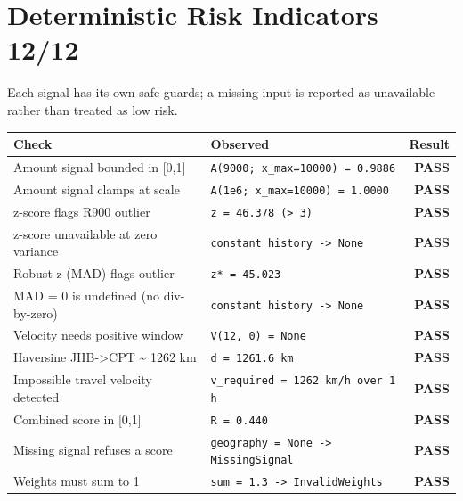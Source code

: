 \documentclass[11pt,a4paper]{article}
\newcommand{\pass}{\textcolor{PassGreen}{\textbf{PASS}}}
\begin{document}
\section*{Deterministic Risk Indicators \hfill \normalsize\textcolor{ADGBlue}{12/12}}
\noindent Each signal has its own safe guards; a missing input is reported as unavailable rather than treated as low risk.\par\vspace{0.4em}
\renewcommand{\arraystretch}{1.25}
\begin{longtable}{@{}p{}p{}r@{}}
\toprule
\textbf{Check} & \textbf{Observed} & \textbf{Result} \\
\midrule
\endhead
Amount signal bounded in [0,1] & \texttt{\small A(9000; x\_max=10000) = 0.9886} & \pass \\
Amount signal clamps at scale & \texttt{\small A(1e6; x\_max=10000) = 1.0000} & \pass \\
z-score flags R900 outlier & \texttt{\small z = 46.378 (\textgreater{} 3)} & \pass \\
z-score unavailable at zero variance & \texttt{\small constant history -\textgreater{} None} & \pass \\
Robust z (MAD) flags outlier & \texttt{\small z* = 45.023} & \pass \\
MAD = 0 is undefined (no div-by-zero) & \texttt{\small constant history -\textgreater{} None} & \pass \\
Velocity needs positive window & \texttt{\small V(12, 0) = None} & \pass \\
Haversine JHB-\textgreater{}CPT \textasciitilde{} 1262 km & \texttt{\small d = 1261.6 km} & \pass \\
Impossible travel velocity detected & \texttt{\small v\_required = 1262 km/h over 1 h} & \pass \\
Combined score in [0,1] & \texttt{\small R = 0.440} & \pass \\
Missing signal refuses a score & \texttt{\small geography = None -\textgreater{} MissingSignal} & \pass \\
Weights must sum to 1 & \texttt{\small sum = 1.3 -\textgreater{} InvalidWeights} & \pass \\
\bottomrule
\end{longtable}
\end{document}
